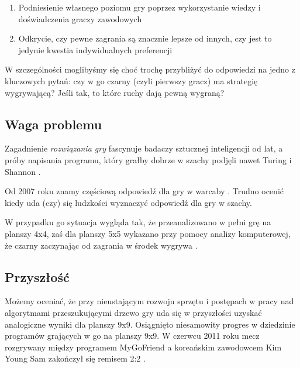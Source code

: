 \documentclass[11pt,leqno]{article}
\begin{document}
\begin{enumerate}
\item Podniesienie własnego poziomu gry poprzez wykorzystanie wiedzy i doświadczenia graczy zawodowych
\item Odkrycie, czy pewne zagrania są znacznie lepsze od innych, czy jest to jedynie kwestia indywidualnych preferencji
\end{enumerate}

W szczególności moglibyśmy się choć trochę przybliżyć do odpowiedzi na jedno z kluczowych pytań: czy w go czarny
 (czyli pierwszy gracz) ma strategię wygrywającą? Jeśli tak, to które ruchy dają pewną wygraną?

\subsection{Waga problemu}

Zagadnienie \emph{rozwiązania gry} fascynuje badaczy sztucznej inteligencji od lat,
 a próby napisania programu, który grałby dobrze w szachy podjęli nawet Turing i Shannon \cite{ai}.

Od 2007 roku znamy częściową  odpowiedź dla gry w warcaby \cite{checkers}. Trudno ocenić kiedy uda (czy) się ludzkości wyznaczyć odpowiedź dla gry w szachy. 

W przypadku go sytuacja wygląda tak, że przeanalizowano w pełni grę na planszy 4x4, 
zaś dla planszy 5x5 wykazano przy pomocy analizy komputerowej, że czarny zaczynając od zagrania w środek wygrywa \cite{gofive}. 

\subsection{Przyszłość}

Możemy oceniać, że przy nieustającym rozwoju sprzętu i postępach w pracy nad  algorytmami przeszukującymi drzewo
gry uda się w przyszłości uzyskać analogiczne wyniki dla planszy 9x9. Osiągnięto niesamowity progres w dziedzinie 
programów grających w go na planszy 9x9. W czerwcu 2011 roku mecz rozgrywany
między programem MyGoFriend a koreańskim zawodowcem Kim Young Sam zakończył się remisem 2:2 \cite{promatch}.
\end{document}
